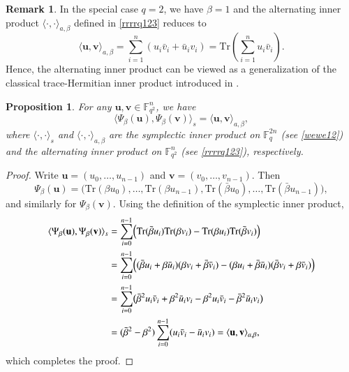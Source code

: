 \documentclass{aims}
\numberwithin{equation}{section}
\newtheorem{proposition}[theorem]{Proposition}
\theoremstyle{definition}
\newtheorem{remark}[theorem]{Remark}
\newcommand{\F}{\mathbb{F}}
\newcommand{\Tr}{\mathrm{Tr}}
\begin{document}
\begin{remark}
	In the special case $q = 2$, we have $\beta = 1$ and the alternating inner product $\langle \cdot,\cdot \rangle_{a,\beta}$ defined in \eqref{rrrrq123} reduces to
	\[
	\langle \pmb{u}, \pmb{v} \rangle_{a,\beta} = \sum_{i=1}^{n} (u_i \bar{v}_i + \bar{u}_i v_i) = \Tr\!\left( \sum_{i=1}^{n} u_i \bar{v}_i \right).
	\]
	Hence, the alternating inner product can be viewed as a generalization of the classical trace-Hermitian inner product introduced in \cite{calderbank1998}.
\end{remark}






\begin{proposition}\label{prop:orth}
	For any $\mathbf{u}, \mathbf{v} \in \F_{q^2}^n$, we have
	\[
	\langle \Psi_\beta(\mathbf{u}), \Psi_\beta(\mathbf{v}) \rangle_s = \langle \mathbf{u}, \mathbf{v} \rangle_{a,\beta},
	\]
	where $\langle \cdot,\cdot \rangle_s$ and $\langle \cdot,\cdot \rangle_{a,\beta}$ are the symplectic inner product on $\F_q^{2n}$ (see \eqref{wewe12}) and the alternating inner product on $\F_{q^2}^n$ (see \eqref{rrrrq123}), respectively.
\end{proposition}
\begin{proof}
	Write $\mathbf{u} = (u_0,\ldots,u_{n-1})$ and $\mathbf{v} = (v_0,\ldots,v_{n-1})$. Then
	\[
	\Psi_\beta(\mathbf{u}) = \bigl(\Tr(\beta u_0),\ldots,\Tr(\beta u_{n-1}),\Tr(\bar{\beta}u_0),\ldots,\Tr(\bar{\beta}u_{n-1})\bigr),
	\]
	and similarly for $\Psi_\beta(\mathbf{v})$. Using the definition of the symplectic inner product,
	\[
	\begin{aligned}
		\langle\Psi_\beta(\mathbf{u}),\Psi_\beta(\mathbf{v})\rangle_s
		&= \sum_{i=0}^{n-1}\Bigl(\Tr(\bar{\beta}u_i)\Tr(\beta v_i) - \Tr(\beta u_i)\Tr(\bar{\beta}v_i)\Bigr)\\
		&= \sum_{i=0}^{n-1}\Bigl((\bar{\beta}u_i+\beta\bar{u}_i)(\beta v_i+\bar{\beta}\bar{v}_i) - (\beta u_i+\bar{\beta}\bar{u}_i)(\bar{\beta}v_i+\beta\bar{v}_i)\Bigr)\\
		&= \sum_{i=0}^{n-1}\bigl(\bar{\beta}^2 u_i\bar{v}_i + \beta^2\bar{u}_i v_i - \beta^2 u_i\bar{v}_i - \bar{\beta}^2\bar{u}_i v_i\bigr)\\
		&= (\bar{\beta}^2-\beta^2)\sum_{i=0}^{n-1}(u_i\bar{v}_i-\bar{u}_i v_i) = \langle\mathbf{u},\mathbf{v}\rangle_{a,\beta},
	\end{aligned}
	\]
which completes the proof. 
\end{proof}
\end{document}
